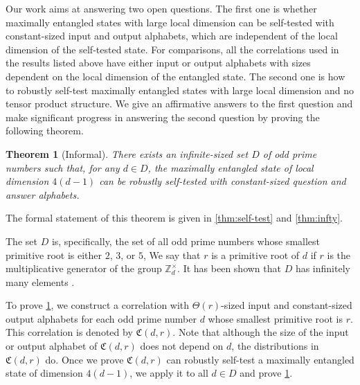 \documentclass[11pt,letterpaper]{article}
\newcommand{\Z}{\mathbb{Z}}
\newcommand{\Zd}{\Z_d^{\times}}
\newcommand{\1}{\mathbb{1}}
\newcommand{\fC}{\mathfrak{C}}
\newtheorem{theorem}{Theorem}[section]
\theoremstyle{definition}
\begin{document}
 
Our work aims at answering two open questions.
The first one is whether maximally entangled states with large local dimension
can be self-tested with constant-sized input and output alphabets, 
which are independent of the local dimension of the self-tested state.
For comparisons, all the correlations used in the results listed above
have either input or output alphabets with sizes dependent on the
local dimension of the entangled state.
The second one is how to robustly self-test maximally entangled states
with large local dimension and no tensor product structure. 
We give an affirmative answers to the first question and
make significant progress in answering the second question
by proving the following theorem.
\begin{theorem}[Informal]
\label{thm:inf}
	There exists an infinite-sized set $D$ of odd prime numbers such that, for any $d \in D$, 
	the maximally entangled state of local dimension $4(d-1)$ can be robustly self-tested 
	with constant-sized question and answer alphabets.
\end{theorem}
The formal statement of this theorem is given in \cref{thm:self-test} and \cref{thm:infty}.

The set $D$ is, specifically, the set of all 
odd prime numbers whose smallest primitive root 
is either $2$, $3$, or $5$, 
We say that $r$ is a primitive root of $d$ if $r$ is the 
multiplicative generator of the group $\Zd$.
It has been shown that $D$ has infinitely many elements \cite{murty1988}.

To prove \cref{thm:inf}, we construct a correlation with $\Theta(r)$-sized
input and constant-sized output alphabets
for each odd prime number $d$ whose smallest primitive root is $r$.
This correlation is denoted by $\fC(d,r)$.
Note that although the size of the input or output alphabet of $\fC(d,r)$ does not depend on $d$, 
the distributions in $\fC(d,r)$ do. 
Once we prove $\fC(d,r)$ can robustly self-test a maximally entangled
state of dimension $4(d-1)$, we apply it to all $d \in D$
and prove \cref{thm:inf}.
\end{document}
